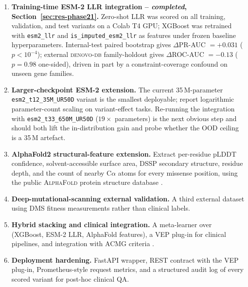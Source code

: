 \documentclass[11pt,a4paper,oneside]{report}
\begin{document}
\begin{enumerate}[leftmargin=1.8em, itemsep=0.3em]
\item \textbf{Training-time ESM-2 LLR integration --
\emph{completed}, Section~\ref{sec:res-phase21}.}
Zero-shot LLR was scored on all training, validation, and
test variants on a Colab T4 GPU; XGBoost was retrained with
\texttt{esm2\_llr} and \texttt{is\_imputed\_esm2\_llr} as
features under frozen baseline hyperparameters.
Internal-test paired bootstrap gives
$\Delta$PR-AUC $=+0.031$ ($p<10^{-4}$); external
\textsc{denovo-db} family-holdout gives
$\Delta$ROC-AUC $=-0.13$ ($p=0.98$ one-sided), driven in
part by a constraint-coverage confound on unseen gene
families.

\item \textbf{Larger-checkpoint ESM-2 extension.} The
current 35\,M-parameter
\texttt{esm2\_t12\_35M\_UR50D} variant is the smallest
deployable; \citet{lin2023esm2} report logarithmic
parameter-count scaling on variant-effect tasks. Re-running
the integration with \texttt{esm2\_t33\_650M\_UR50D}
($19\times$ parameters) is the next obvious step and
should both lift the in-distribution gain and probe
whether the OOD ceiling is a 35\,M artefact.

\item \textbf{AlphaFold2 structural-feature extension.}
Extract per-residue pLDDT confidence, solvent-accessible
surface area, DSSP secondary structure, residue depth, and
the count of nearby $\text{C}\alpha$ atoms for every
missense position, using the public \textsc{AlphaFold}
protein structure database
\citep{jumper2021alphafold2, varadi2022alphafolddb}.

\item \textbf{Deep-mutational-scanning external validation.}
A third external dataset \citep{notin2023proteingym} using
DMS fitness measurements rather than clinical labels.

\item \textbf{Hybrid stacking and clinical integration.} A
meta-learner over (XGBoost, ESM-2 LLR, AlphaFold features),
a \textsc{VEP} plug-in for clinical pipelines, and
integration with ACMG criteria \citep{richards2015acmg}.

\item \textbf{Deployment hardening.} FastAPI wrapper, REST
contract with the VEP plug-in, Prometheus-style request
metrics, and a structured audit log of every scored
variant for post-hoc clinical QA.
\end{enumerate}
\end{document}
